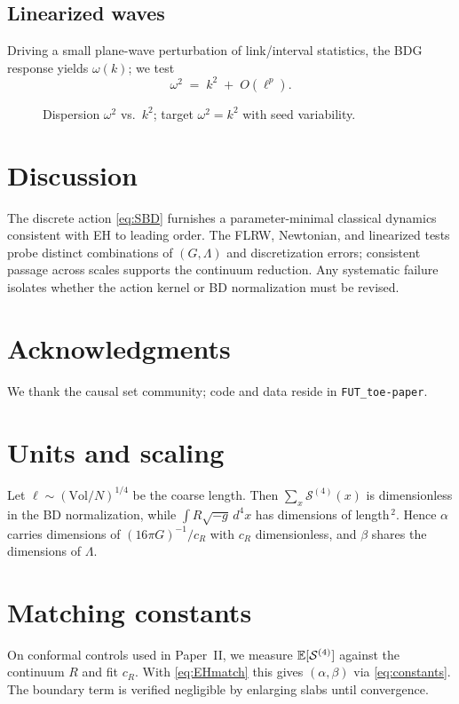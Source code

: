 \subsection*{Linearized waves}
Driving a small plane-wave perturbation of link/interval statistics, the BDG response yields $\omega(k)$; we test
\begin{equation}
\omega^2 \;=\; k^2 \;+\; O(\ell^p).
\end{equation}
\begin{figure}[H]\centering
{}
\caption{Dispersion $\omega^2$ vs.\ $k^2$; target $\omega^2=k^2$ with seed variability.}
\end{figure}

\FloatBarrier
\clearpage

\section{Discussion}
The discrete action \eqref{eq:SBD} furnishes a parameter-minimal classical dynamics consistent with EH to leading order. The FLRW, Newtonian, and linearized tests probe distinct combinations of $(G,\Lambda)$ and discretization errors; consistent passage across scales supports the continuum reduction. Any systematic failure isolates whether the action kernel or BD normalization must be revised.

\section*{Acknowledgments}
We thank the causal set community; code and data reside in \texttt{FUT\_toe-paper}.

\appendix

\section{Units and scaling}
Let $\ell\sim(\mathrm{Vol}/N)^{1/4}$ be the coarse length. Then $\sum_x \mathcal{S}^{(4)}(x)$ is dimensionless in the BD normalization, while $\int R\sqrt{-g}\,d^4x$ has dimensions of length$^{\,2}$. Hence $\alpha$ carries dimensions of $(16\pi G)^{-1}/c_R$ with $c_R$ dimensionless, and $\beta$ shares the dimensions of $\Lambda$.

\section{Matching constants}\label{app:matching}
On conformal controls used in Paper~II, we measure $\mathbb{E}[\mathcal{S}^{(4)}]$ against the continuum $R$ and fit $c_R$. With \eqref{eq:EHmatch} this gives $(\alpha,\beta)$ via \eqref{eq:constants}. The boundary term is verified negligible by enlarging slabs until convergence.

